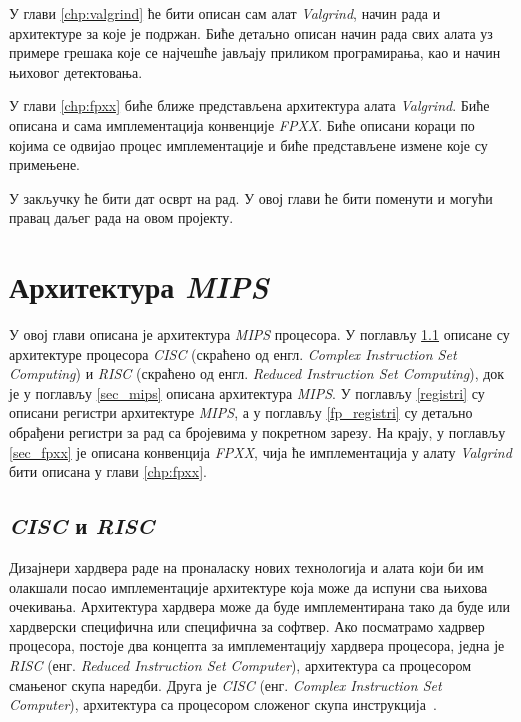 \documentclass[12pt,oneside]{memoir}
\begin{document}
\indent У глави \ref{chp:valgrind} ће бити описан сам алат \textit{Valgrind}, начин рада и архитектуре за које је подржан. Биће детаљно описан начин рада свих алата уз примере грешака које се најчешће јављају приликом програмирања, као и начин њиховог детектовања.

\indent У глави \ref{chp:fpxx} биће ближе представљена архитектура алата \textit{Valgrind}. Биће описана и сама имплементација конвенције \textit{FPXX}. Биће описани кораци по којима се одвијао процес имплементације и биће представљене измене које су примењене.

\indent У закључку ће бити дат осврт на рад. У овој глави ће бити поменути и могући правац даљег рада на овом пројекту.
\chapter{Архитектура \textit{MIPS}}
\label{chp:mips}

\indent У овој глави описана је архитектура \textit{MIPS} процесора. У поглављу \ref{cisc_risc} описане су архитектуре процесора \textit{CISC} (скраћено од енгл. \textit{Complex Instruction Set Computing}) и \textit{RISC} (скраћено од енгл. \textit{Reduced Instruction Set Computing}), док је у поглављу \ref{sec_mips} описана архитектура \textit{MIPS}. У поглављу  \ref{registri} су описани регистри архитектуре \textit{MIPS}, а у поглављу \ref{fp_registri} су детаљно обрађени регистри за рад са бројевима у покретном зарезу. На крају, у поглављу \ref{sec_fpxx} је описана конвенција \textit{FPXX}, чија ће имплементација у алату \textit{Valgrind} бити описана у глави \ref{chp:fpxx}.

\section{\textit{CISC} и \textit{RISC}}
\label{cisc_risc}

\indent Дизајнери хардвера раде на проналаску нових технологија и алата који би им олакшали посао имплементације архитектуре која може да испуни сва њихова очекивања. Архитектура хардвера може да буде имплементирана тако да буде или хардверски специфична или специфична за софтвер. Ако посматрамо хадрвер процесора, постоје два концепта за имплементацију хардвера процесора, једна је \textit{RISC} (енг. \textit{Reduced Instruction Set Computer}), архитектура са процесором смањеног скупа наредби. Друга је \textit{CISC} (енг. \textit{Complex Instruction Set Computer}), архитектура са процесором сложеног скупа инструкција~\cite{rcRef}.
\end{document}
